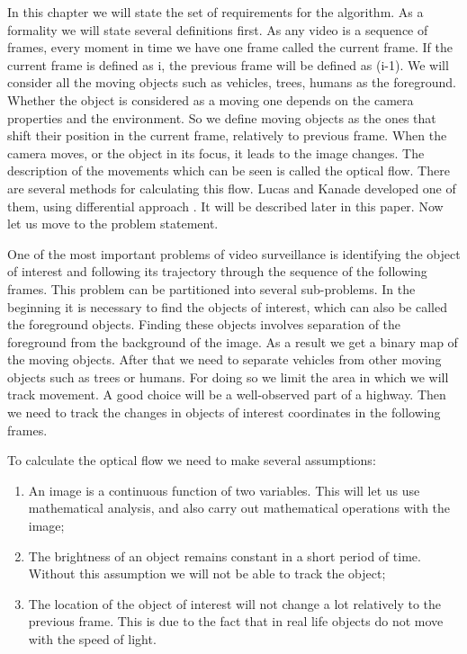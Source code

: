 \documentclass[12pt,a4paper,oneside,titlepage]{article}
\begin{document}
In this chapter we will state the set of requirements for the algorithm.
As a formality we will state several definitions first.
As any video is a sequence of frames, every moment in time we have one frame called the current frame.
If the current frame is defined as i, the previous frame will be defined as (i-1).
We will consider all the moving objects such as vehicles, trees, humans as the foreground.
Whether the object is considered as a moving one depends on the camera properties and the environment.
So we define moving objects as the ones that shift their position in the current frame, relatively to previous frame.
When the camera moves, or the object in its focus, it leads to the image changes.
The description of the movements which can be seen is called the optical flow.
There are several methods for calculating this flow.
Lucas and Kanade developed one of them, using differential approach \cite{lucaskanade}.
It will be described later in this paper.
Now let us move to the problem statement.

One of the most important problems of video surveillance is identifying the object of interest and following its trajectory through the sequence of the following frames.
This problem can be partitioned into several sub-problems.
In the beginning it is necessary to find the objects of interest, which can also be called the foreground objects.
Finding these objects involves separation of the foreground from the background of the image.
As a result we get a binary map of the moving objects.
After that we need to separate vehicles from other moving objects such as trees or humans. 
For doing so we limit the area in which we will track movement.
A good choice will be a well-observed part of a highway. 
Then we need to track the changes in objects of interest coordinates in the following frames.

To calculate the optical flow we need to make several assumptions:
\begin{enumerate}
  \item An image is a continuous function of two variables. This will let us use mathematical analysis, and also carry out mathematical operations with the image;
  \item The brightness of an object remains constant in a short period of time. Without this assumption we will not be able to track the object;
  \item The location of the object of interest will not change a lot relatively to the previous frame. This is due to the fact that in real life objects do not move with the speed of light.
\end{enumerate}
\end{document}
